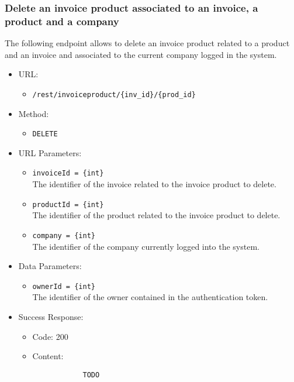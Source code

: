 \subsubsection*{Delete an invoice product associated to an invoice, a product and a company}

The following endpoint allows to delete an invoice product related to a product and an invoice and associated to the current company logged in the system.

\begin{itemize}
    
    \item URL: 
    \begin{itemize}
        \item \texttt{/rest/invoiceproduct/\{inv\_id\}/\{prod\_id\}}
    \end{itemize}

    \item Method: 
    \begin{itemize}
        \item \texttt{DELETE}
    \end{itemize}
    
    \item URL Parameters: 
    \begin{itemize}
        \item \texttt{invoiceId = \{int\}} \\
        The identifier of the invoice related to the invoice product to delete.
	\item \texttt{productId = \{int\}} \\
        The identifier of the product related to the invoice product to delete.
        \item \texttt{company = \{int\}} \\
        The identifier of the company currently logged into the system.
    \end{itemize}
    
    \item Data Parameters: 
    \begin{itemize}
        \item \texttt{ownerId = \{int\}} \\
        The identifier of the owner contained in the authentication token.
    \end{itemize}
    
    \item Success Response: 
    \begin{itemize}
        \item Code: 200
        \item Content:
        \begin{lstlisting}
            TODO
        \end{lstlisting}    
    \end{itemize}
    

\end{itemize}
